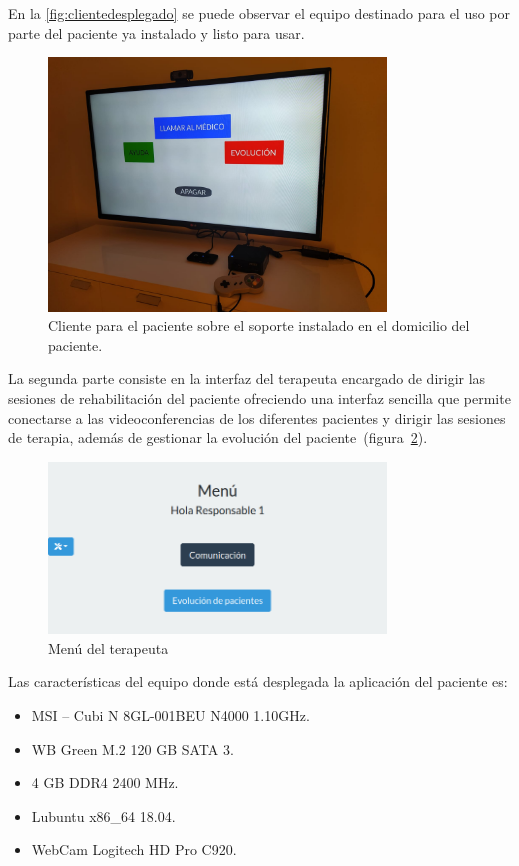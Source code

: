En la \autoref{fig:clientedesplegado} se puede observar el equipo destinado para el uso por parte del paciente ya instalado y listo para usar.

\begin{figure}
	\centering
	\includegraphics[width=0.8\textwidth]{img/desplieguefisico2.jpeg}
	\caption{Cliente para el paciente sobre el soporte instalado en el domicilio del paciente.}
	\label{fig:clientedesplegado}
\end{figure}

La segunda parte consiste en la interfaz del terapeuta encargado de dirigir las sesiones de rehabilitación del paciente ofreciendo una interfaz sencilla que permite conectarse a las videoconferencias de los diferentes pacientes y dirigir las sesiones de terapia, además de gestionar la evolución del paciente~(figura~\ref{fig:menu_respon}).

\begin{figure}
	\centering
	\includegraphics[width=0.8\textwidth]{img/menu_responsable.png}
	\caption{Menú del terapeuta}
	\label{fig:menu_respon}
\end{figure}

Las características del equipo donde está desplegada la aplicación del paciente es:
\begin{itemize}
	\item MSI -- Cubi N 8GL-001BEU N4000 1.10GHz.
	\item WB Green M.2 120 GB SATA 3.
	\item 4 GB DDR4 2400 MHz.
	\item Lubuntu x86\_64 18.04.
	\item WebCam Logitech HD Pro C920.
\end{itemize}

